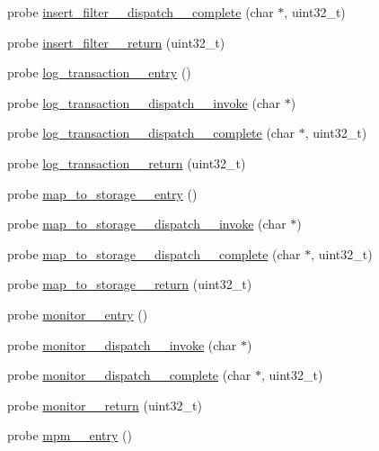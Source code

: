 \begin{DoxyCompactItemize}
\item 
probe \hyperlink{apache__probes_8d_a67a180b1e25436011500e172c5d51acb}{insert\+\_\+filter\+\_\+\+\_\+dispatch\+\_\+\+\_\+complete} (char $\ast$, uint32\+\_\+t)
\item 
probe \hyperlink{apache__probes_8d_af8e3bdebbe9490905319b24c71f4940b}{insert\+\_\+filter\+\_\+\+\_\+return} (uint32\+\_\+t)
\item 
probe \hyperlink{apache__probes_8d_a6308dd1702c7254474c4a6ec7624cf2a}{log\+\_\+transaction\+\_\+\+\_\+entry} ()
\item 
probe \hyperlink{apache__probes_8d_aefd19a723b159471827d791b1e75c4cd}{log\+\_\+transaction\+\_\+\+\_\+dispatch\+\_\+\+\_\+invoke} (char $\ast$)
\item 
probe \hyperlink{apache__probes_8d_a2560af36df2865b945320a7408045385}{log\+\_\+transaction\+\_\+\+\_\+dispatch\+\_\+\+\_\+complete} (char $\ast$, uint32\+\_\+t)
\item 
probe \hyperlink{apache__probes_8d_a5fb347c16a542bee14bf84d29d730173}{log\+\_\+transaction\+\_\+\+\_\+return} (uint32\+\_\+t)
\item 
probe \hyperlink{apache__probes_8d_a5f7a96e7cbf2b2d220330502da2555b6}{map\+\_\+to\+\_\+storage\+\_\+\+\_\+entry} ()
\item 
probe \hyperlink{apache__probes_8d_ac695705c12e74c7efc5d5dd1d75c6ed0}{map\+\_\+to\+\_\+storage\+\_\+\+\_\+dispatch\+\_\+\+\_\+invoke} (char $\ast$)
\item 
probe \hyperlink{apache__probes_8d_a30eb50d022ed9c40e643fad0f7c1897e}{map\+\_\+to\+\_\+storage\+\_\+\+\_\+dispatch\+\_\+\+\_\+complete} (char $\ast$, uint32\+\_\+t)
\item 
probe \hyperlink{apache__probes_8d_a7c7ae5c7b2f18191e3e48e0b9701fe2f}{map\+\_\+to\+\_\+storage\+\_\+\+\_\+return} (uint32\+\_\+t)
\item 
probe \hyperlink{apache__probes_8d_a4346da5cca7bbe73f081d07cc9f1e908}{monitor\+\_\+\+\_\+entry} ()
\item 
probe \hyperlink{apache__probes_8d_ae36f6e380b280a4df4da119770317a48}{monitor\+\_\+\+\_\+dispatch\+\_\+\+\_\+invoke} (char $\ast$)
\item 
probe \hyperlink{apache__probes_8d_a7485bb31fcc38c08b56c42879b4b4c34}{monitor\+\_\+\+\_\+dispatch\+\_\+\+\_\+complete} (char $\ast$, uint32\+\_\+t)
\item 
probe \hyperlink{apache__probes_8d_a9d1b026b6e927fd1e76b29fde54449ce}{monitor\+\_\+\+\_\+return} (uint32\+\_\+t)
\item 
probe \hyperlink{apache__probes_8d_a1c31f108f78399c5bf9a8d525b4b0c97}{mpm\+\_\+\+\_\+entry} ()

\end{DoxyCompactItemize}
